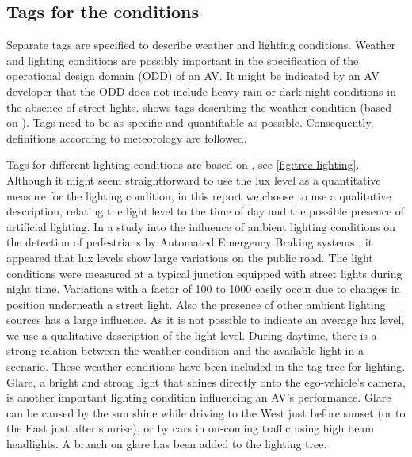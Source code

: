 \subsection{Tags for the conditions}

Separate tags are specified to describe weather and lighting conditions. Weather and lighting conditions are possibly important in the specification of the operational design domain (ODD) of an AV. It might be indicated by an AV developer that the ODD does not include heavy rain or dark night conditions in the absence of street lights.  shows tags describing the weather condition (based on \cite{mahmassani2012use}). Tags need to be as specific and quantifiable as possible. Consequently, definitions according to meteorology are followed. 

Tags for different lighting conditions are based on \cite{golob2003relationships}, see \cref{fig:tree lighting}. Although it might seem straightforward to use the lux level as a quantitative measure for the lighting condition, in this report we choose to use a qualitative description, relating the light level to the time of day and the possible presence of artificial lighting. In a study into the influence of ambient lighting conditions on the detection of pedestrians by Automated Emergency Braking systems \cite{lighting_IenM}, it appeared that lux levels show large variations on the public road. The light conditions were measured at a typical junction equipped with street lights during night time. Variations with a factor of 100 to 1000 easily occur due to changes in position underneath a street light. Also the presence of other ambient lighting sources has a large influence. As it is not possible to indicate an average lux level, we use a qualitative description of the light level. 
During daytime, there is a strong relation between the weather condition and the available light in a scenario. These weather conditions have been included in the tag tree for lighting.
Glare, a bright and strong light that shines directly onto the ego-vehicle's camera, is another important lighting condition influencing an AV's performance. Glare can be caused by the sun shine while driving to the West just before sunset (or to the East just after sunrise), or by cars in on-coming traffic using high beam headlights. A branch on glare has been added to the lighting tree.  

